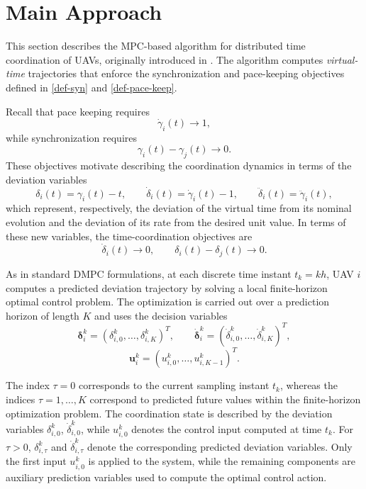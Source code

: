\documentclass[letterpaper,journal]{IEEEtran}
\begin{document}
\section{Main Approach}\label{sec:mpc}

This section describes the MPC-based algorithm for distributed time coordination of UAVs, originally introduced in \cite{paper}.
The algorithm computes \emph{virtual-time} trajectories that enforce the synchronization and pace-keeping objectives defined in \eqref{def-syn} and \eqref{def-pace-keep}.

Recall that pace keeping requires
\[
\dot\gamma_i(t)\to 1,
\]
while synchronization requires
\[
\gamma_i(t)-\gamma_j(t)\to 0.
\]
These objectives motivate describing the coordination dynamics in terms of the deviation variables 
\[
\delta_{i}(t)=\gamma_i(t)-t,\qquad
\dot\delta_{i}(t)=\dot\gamma_i(t)-1,\qquad
\ddot\delta_i(t)=\ddot\gamma_i(t),
\]
which represent, respectively, the deviation of the virtual time from its nominal evolution and the deviation of its rate from the desired unit value.  In terms of these new variables, the time-coordination objectives are
\[
\dot\delta_i(t)\to 0, \qquad \delta_i(t)-\delta_j(t)\to 0.
\]


As in standard DMPC formulations,  at each discrete time instant \(t_k=kh\), UAV \(i\) computes a predicted deviation trajectory by solving a local finite-horizon optimal control problem. The optimization is carried out over a prediction horizon of length \(K\) and uses the decision variables
\[
\bm{\delta}^k_i = (\delta^k_{i,0}, \dots, \delta^k_{i,K})^T,
\qquad
\dot{\bm{\delta}}^k_i = (\dot\delta^k_{i,0}, \dots, \dot\delta^k_{i,K})^T,
\]
\[
\bm{u}^k_i = (u^k_{i,0}, \dots, u^k_{i,K-1})^T.
\]

The index \(\tau=0\) corresponds to the current sampling instant \(t_k\), whereas the indices \(\tau=1,\dots,K\) correspond to predicted future values within the finite-horizon optimization problem. 
The coordination state is described by the deviation variables $\delta_{i,0}^k$, $\dot\delta_{i,0}^k$, while $u_{i,0}^k$
denotes the control input computed at time \(t_k\). For $\tau>0$, \(\delta_{i,\tau}^k\) and \(\dot\delta_{i,\tau}^k\) denote the corresponding predicted deviation variables. Only the first input \(u^k_{i,0}\) is applied to the system, while the remaining components are auxiliary prediction variables used to compute the optimal control action.
\end{document}
